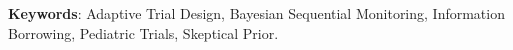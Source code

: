 \documentclass[12pt]{article}
\begin{document}

\vspace{1.5cm}
\noindent
\textbf{Keywords}:
 Adaptive Trial Design, Bayesian Sequential Monitoring, Information Borrowing, Pediatric Trials, Skeptical Prior.


\newpage

\renewcommand\thesection{\arabic{section}}
\renewcommand\thesubsection{\arabic{section}.\arabic{subsection}}



%

%
\end{document}
